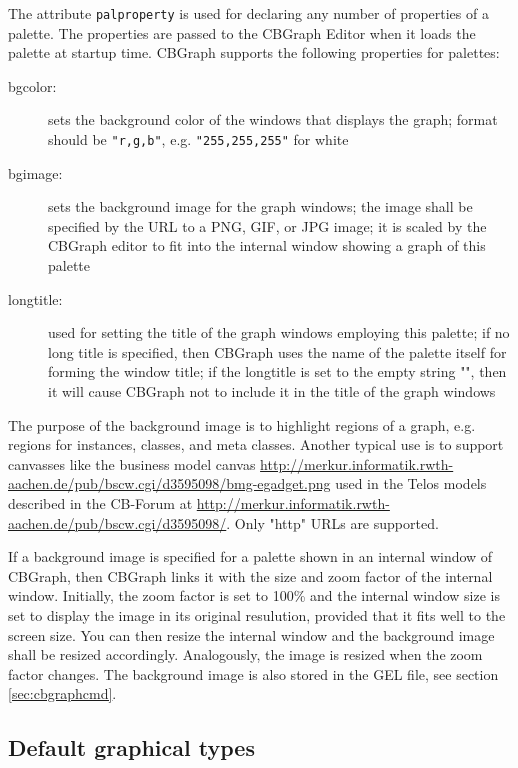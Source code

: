 The attribute {\tt palproperty} is used for declaring any number of properties
of a palette. The properties are passed to the CBGraph Editor when it loads
the palette at startup time. CBGraph supports the following properties for palettes:

\begin{description}
\item[bgcolor:] sets the background color of the windows that displays the graph;
  format should be {\tt "r,g,b"}, e.g. {\tt "255,255,255"} for white
\item[bgimage:] sets the background image for the graph windows; the image shall
  be specified by the URL to a PNG, GIF, or JPG image;
  it is scaled by the CBGraph editor to fit into the internal window showing a graph of this palette
\item[longtitle:] used for setting the title of the graph windows employing this palette;
  if no long title is specified, then CBGraph uses the name of the palette itself for
  forming the window title; if the longtitle is set to the empty string "", then
  it will cause CBGraph not to include it in the title of the graph windows
\end{description}

The purpose of the background image is to highlight regions of a graph, e.g. regions for
instances, classes, and meta classes. Another typical use is to support canvasses
like the business model canvas
\url{http://merkur.informatik.rwth-aachen.de/pub/bscw.cgi/d3595098/bmg-egadget.png} used
in the Telos models described in the CB-Forum at
\url{http://merkur.informatik.rwth-aachen.de/pub/bscw.cgi/d3595098/}.
Only "http" URLs are supported.

If a background image is specified for a palette shown in an internal window of CBGraph,
then CBGraph links it with the size and zoom factor of the internal window. Initially, the
zoom factor is set to 100\% and the internal window size is set to display the image
in its original resulution, provided that it fits well to the screen size.
You can then resize the internal window and the background image shall be resized
accordingly. Analogously, the image is resized when the zoom factor changes.
The background image is also stored in the GEL file, see section \ref{sec:cbgraphcmd}.


\subsection{Default graphical types}

